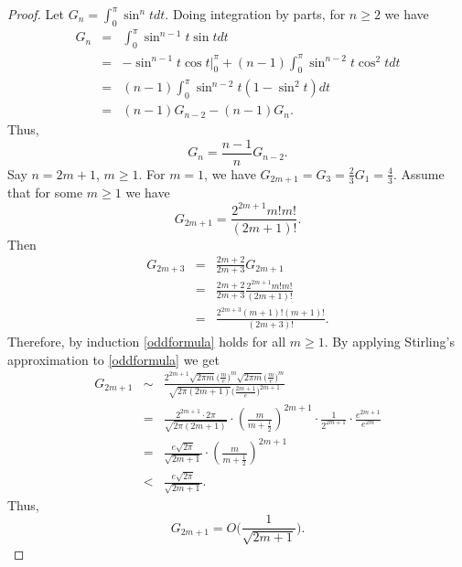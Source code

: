 \documentclass{article}
\begin{document}
\begin{proof}
Let $G_n=\int_0^\pi \sin^n t dt$. 
Doing integration by parts, for $n \geq 2$ we have
\begin{eqnarray*}
G_n&=&\int_0^\pi \sin^{n-1}t \sin t dt\\
&=&-\sin^{n-1}t \cos t \Big |_0^\pi+(n-1)\int_0^\pi \sin^{n-2}t \cos^2 t dt\\
&=&(n-1)\int_0^\pi \sin^{n-2}t (1-\sin^2 t) dt\\
&=&(n-1)G_{n-2}-(n-1)G_n.
\end{eqnarray*}
Thus,
\[
G_n=\frac{n-1}{n}G_{n-2}.
\]
Say $n=2m+1$, $m \geq 1$.
For $m=1$, we have $G_{2m+1}=G_3=\frac{2}{3}G_1=\frac{4}{3}$. Assume that for some $m \geq 1$ we have
\begin{equation}
G_{2m+1}=\frac{2^{2m+1}m!m!}{(2m+1)!}.
\label{oddformula}
\end{equation}
Then
\begin{eqnarray*}
G_{2m+3}&=&\frac{2m+2}{2m+3}G_{2m+1}\\
&=&\frac{2m+2}{2m+3} \frac{2^{2m+1}m!m!}{(2m+1)!}\\
&=&\frac{2^{2m+3}(m+1)!(m+1)!}{(2m+3)!}.
\end{eqnarray*}
Therefore, by induction \eqref{oddformula} holds for all $m \geq 1$.
By applying Stirling's approximation to \eqref{oddformula} we get
\begin{eqnarray*}
G_{2m+1}&\sim&\frac{2^{2m+1} \sqrt{2\pi m} \Big(\frac{m}{e}\Big)^m 
 \sqrt{2\pi m} \Big(\frac{m}{e}\Big)^m}{\sqrt{2\pi(2m+1)}\Big( \frac{2m+1}{e} \Big)^{2m+1}}\\
 &=&\frac{2^{2m+1}\cdot 2\pi}{\sqrt{2\pi (2m+1)}}\cdot \left(\frac{m}{m+\frac{1}{2}} \right)^{2m+1} \cdot \frac{1}{2^{2m+1}} \cdot \frac{e^{2m+1}}{e^{2m}}\\
&=&\frac{e\sqrt{2\pi}}{\sqrt{2m+1}} \cdot \left(\frac{m}{m+\frac{1}{2}} \right)^{2m+1}\\
&<&\frac{e\sqrt{2\pi}}{\sqrt{2m+1}}.
\end{eqnarray*}
Thus,
\[
G_{2m+1}=O\Big(\frac{1}{\sqrt{2m+1}}\Big).
\]


\end{proof}
\end{document}
